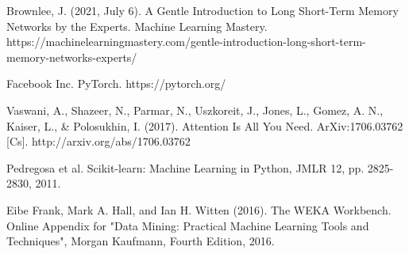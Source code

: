 \documentclass[conference]{IEEEtran}
\begin{document}
\begin{thebibliography}{00}
Brownlee, J. (2021, July 6). A Gentle Introduction to Long Short-Term Memory Networks by the Experts. Machine Learning Mastery. https://machinelearningmastery.com/gentle-introduction-long-short-term-memory-networks-experts/

Facebook Inc. PyTorch. https://pytorch.org/

Vaswani, A., Shazeer, N., Parmar, N., Uszkoreit, J., Jones, L., Gomez, A. N., Kaiser, L., \& Polosukhin, I. (2017). Attention Is All You Need. ArXiv:1706.03762 [Cs]. http://arxiv.org/abs/1706.03762

Pedregosa et al. Scikit-learn: Machine Learning in Python, JMLR 12, pp. 2825-2830, 2011.

Eibe Frank, Mark A. Hall, and Ian H. Witten (2016). The WEKA Workbench. Online Appendix for "Data Mining: Practical Machine Learning Tools and Techniques", Morgan Kaufmann, Fourth Edition, 2016.

\end{thebibliography}
\vspace{12pt}
\end{document}
